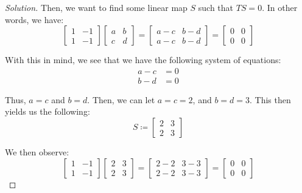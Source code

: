 \documentclass{article}
\newenvironment{solution}{\begin{proof}[Solution]}{\end{proof}}
\begin{document}
\begin{solution}
		Then, we want to find some linear map $S$ such that $TS = 0$. In other words, we have:
		\begin{equation*}
			\begin{bmatrix}
				1 & -1 \\ 1 & -1
			\end{bmatrix}
			\begin{bmatrix}
				a & b \\ c & d
			\end{bmatrix}
			=
			\begin{bmatrix}
				a - c & b - d \\
				a - c & b - d
			\end{bmatrix}
			=
			\begin{bmatrix}
				0 & 0 \\
				0 & 0
			\end{bmatrix}
		\end{equation*}
	
		With this in mind, we see that we have the following system of equations:
		\begin{align*}
			a - c &= 0 \\
			b - d &= 0
		\end{align*}
	
		Thus, $a = c$ and $b = d$. Then, we can let $a = c = 2$, and $b = d = 3$. This then yields us the following:
		\begin{equation*}
			S \coloneq 
			\begin{bmatrix}
				2 & 3 \\ 2 & 3
			\end{bmatrix}
		\end{equation*}
		
		We then observe:
		\begin{equation*}
			\begin{bmatrix}
				1 & -1 \\ 1 & -1
			\end{bmatrix}
			\begin{bmatrix}
				2 & 3 \\
				2 & 3
			\end{bmatrix}
			=
			\begin{bmatrix}
				2 - 2 & 3 - 3 \\ 2 - 2 & 3 - 3
			\end{bmatrix}
			=
			\begin{bmatrix}
				0 & 0 \\ 0 & 0
			\end{bmatrix}
		\end{equation*}
	

\end{solution}
\end{document}
